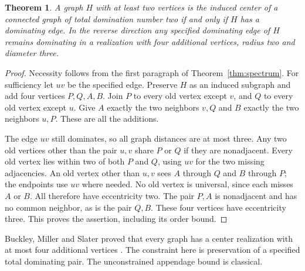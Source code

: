 \documentclass[11pt]{article}
\newtheorem{thm}{Theorem}[section]
\begin{document}
\begin{thm}\label{thm:real}
A graph $H$ with at least two vertices is the induced center of a connected
graph of total domination number two if and only if $H$ has a dominating
edge. In the reverse direction any specified dominating edge of $H$ remains
dominating in a realization with four additional vertices, radius two and
diameter three.
\end{thm}
\begin{proof}
Necessity follows from the first paragraph of Theorem~\ref{thm:spectrum}.
For sufficiency let $uv$ be the specified edge. Preserve $H$ as an induced
subgraph and add four vertices $P,Q,A,B$. Join $P$ to every old vertex
except $v$, and $Q$ to every old vertex except $u$. Give $A$ exactly
the two neighbors $v,Q$ and $B$ exactly the two neighbors $u,P$.
These are all the additions.

The edge $uv$ still dominates, so all graph distances are at most three.
Any two old vertices other than the pair $u,v$ share $P$ or $Q$ if they
are nonadjacent. Every old vertex lies within two of both $P$ and $Q$,
using $uv$ for the two missing adjacencies. An old vertex other than
$u,v$ sees $A$ through $Q$ and $B$ through $P$; the endpoints use $uv$
where needed. No old vertex is universal, since each misses $A$ or $B$.
All therefore have eccentricity two. The pair $P,A$ is nonadjacent and
has no common neighbor, as is the pair $Q,B$. These four vertices have
eccentricity three. This proves the assertion, including its order bound.
\end{proof}
Buckley, Miller and Slater proved that every graph has a center realization
with at most four additional vertices \cite{bms}. The constraint here is
preservation of a specified total dominating pair. The unconstrained
appendage bound is classical.
\end{document}
